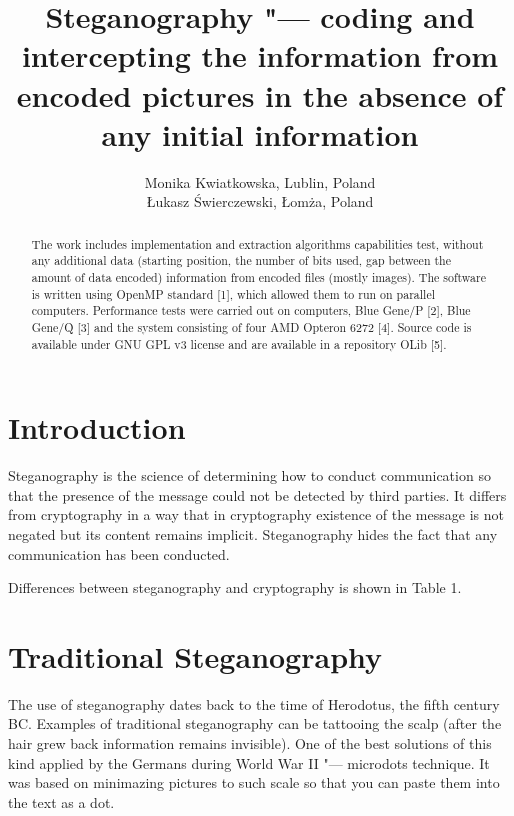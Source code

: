 \documentclass[10pt, a5paper]{article}
\begin{document}
\title{Steganography "--- coding and intercepting the information from encoded pictures in the absence of any initial information}
\author{Monika Kwiatkowska, Lublin, Poland\\[-2ex] \L{}ukasz \'S{}wierczewski, \L{}om\.z{}a, Poland}
\maketitle
\begin{abstract}
The work includes implementation and extraction algorithms capabilities test, without any additional data (starting position, the number of bits used, gap between the amount of data encoded) information from encoded files (mostly images). The software is written using OpenMP standard [1], which allowed them to run on parallel computers. Performance tests were carried out on computers, Blue Gene/P [2], Blue Gene/Q [3] and the system consisting of four AMD Opteron 6272 [4]. Source code is available under GNU GPL v3 license and are available in a repository OLib [5].
\end{abstract}
\section{Introduction}

Steganography is the science of determining how to conduct commu\-ni\-ca\-tion so that the presence of the message could not be detected by third parties. It differs from cryptography in a way that in cryptography existence of the message is not negated but its content remains implicit. Steganography hides the fact that any communication has been con\-duct\-ed.

Differences between steganography and cryptography is shown in Table 1.

\section{Traditional Steganography}
The use of steganography dates back to the time of Herodotus, the fifth century BC. Examples of traditional steganography can be tattooing the scalp (after the hair grew back information remains in\-vi\-sible). One of the best solutions of this kind applied by the Germans during World War II "--- microdots technique. It was based on minimazing  pictures to such scale so that you can paste them into the text as a dot.
\end{document}
